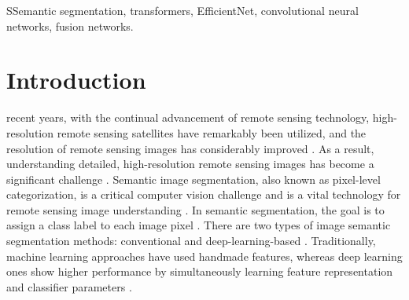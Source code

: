 \documentclass[journal]{IEEEtran}
\begin{document}
\begin{IEEEkeywords}
SSemantic segmentation, transformers, EfficientNet, convolutional neural networks, fusion networks.
\end{IEEEkeywords}






\IEEEpeerreviewmaketitle



\section{Introduction}
 recent years, with the continual advancement of remote sensing technology, high-resolution remote sensing satellites have remarkably been utilized, and the resolution of remote sensing images has considerably improved \cite{WANG2022104969}. As a result, understanding detailed, high-resolution remote sensing images has become a significant challenge \cite{MA2019166}. Semantic image segmentation, also known as pixel-level categorization, is a critical computer vision challenge and is a vital technology for remote sensing image understanding \cite{MI2020140}. In semantic segmentation, the goal is to assign a class label to each image pixel \cite{YUAN2021114417}. 
There are two types of image semantic segmentation methods: conventional and deep-learning-based \cite{9081937}. Traditionally, machine learning approaches have used handmade features, whereas deep learning ones show higher performance by simultaneously learning feature representation and classifier parameters \cite{MI2020140}. 
\end{document}
